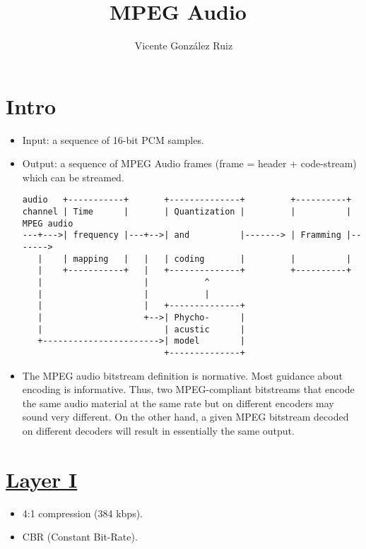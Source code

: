 \title{MPEG Audio~\cite{sayood2017introduction}}
\author{Vicente González Ruiz}
\maketitle
\tableofcontents

\section{Intro}
\begin{itemize}
\item Input: a sequence of 16-bit PCM samples.

\item Output: a sequence of MPEG Audio frames (frame = header +
  code-stream) which can be streamed.

\begin{verbatim}
audio   +-----------+       +--------------+         +----------+
channel | Time      |       | Quantization |         |          | MPEG audio
---+--->| frequency |---+-->| and          |-------> | Framming |------->
   |    | mapping   |   |   | coding       |         |          |
   |    +-----------+   |   +--------------+         +----------+
   |                    |           ^
   |                    |           |
   |                    |   +--------------+
   |                    +-->| Phycho-      |
   |                        | acustic      |
   +----------------------->| model        |
                            +--------------+
\end{verbatim}

\item The MPEG audio bitstream definition is normative. Most guidance
  about encoding is informative. Thus, two MPEG-compliant bitstreams
  that encode the same audio material at the same rate but on
  different encoders may sound very different. On the other hand, a
  given MPEG bitstream decoded on different decoders will result in
  essentially the same output.
\end{itemize}

\section{\href{https://en.wikipedia.org/wiki/MPEG-1_Audio_Layer_I}{Layer I}}
\begin{itemize}
\item 4:1 compression (384 kbps).
\item CBR (Constant Bit-Rate).
\end{itemize}

